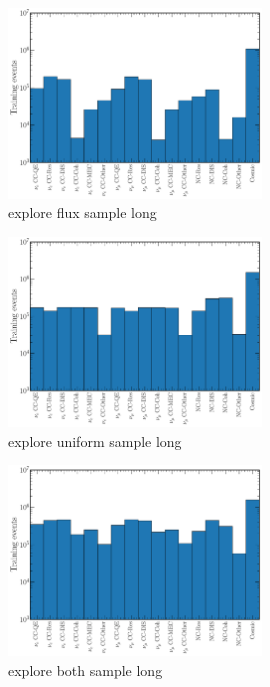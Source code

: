 \begin{figure} %
    \includegraphics[width=0.6\textwidth]{diagrams/7-cvn/chipsnet/explore_flux_sample.pdf}
    \caption[explore flux sample short]
    {explore flux sample long}
    \label{fig:explore_flux_sample}
\end{figure}

\begin{figure} %
    \includegraphics[width=0.6\textwidth]{diagrams/7-cvn/chipsnet/explore_uniform_sample.pdf}
    \caption[explore uniform sample short]
    {explore uniform sample long}
    \label{fig:explore_uniform_sample}
\end{figure}

\begin{figure} %
    \includegraphics[width=0.6\textwidth]{diagrams/7-cvn/chipsnet/explore_both_sample.pdf}
    \caption[explore both sample short]
    {explore both sample long}
    \label{fig:explore_both_sample}
\end{figure}

